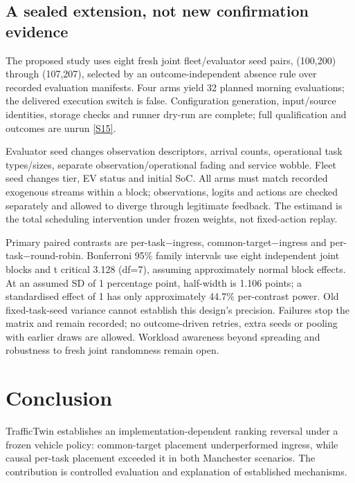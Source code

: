 \documentclass[11pt,a4paper]{article}
\begin{document}
\subsection{A sealed extension, not new confirmation evidence}\label{sec:3.7}

The proposed study uses eight fresh joint fleet/evaluator seed pairs, (100,200) through (107,207), selected by an outcome-independent absence rule over recorded evaluation manifests. Four arms yield 32 planned morning evaluations; the delivered execution switch is false. Configuration generation, input/source identities, storage checks and runner dry-run are complete; full qualification and outcomes are unrun \hyperref[source-s15]{[S15]}.

Evaluator seed changes observation descriptors, arrival counts, operational task types/sizes, separate observation/operational fading and service wobble. Fleet seed changes tier, EV status and initial SoC. All arms must match recorded exogenous streams within a block; observations, logits and actions are checked separately and allowed to diverge through legitimate feedback. The estimand is the total scheduling intervention under frozen weights, not fixed-action replay.

Primary paired contrasts are per-task\ensuremath{-}ingress, common-target\ensuremath{-}ingress and per-task\ensuremath{-}round-robin. Bonferroni 95\% family intervals use eight independent joint blocks and t critical 3.128 (df=7), assuming approximately normal block effects. At an assumed SD of 1 percentage point, half-width is 1.106 points; a standardised effect of 1 has only approximately 44.7\% per-contrast power. Old fixed-task-seed variance cannot establish this design's precision. Failures stop the matrix and remain recorded; no outcome-driven retries, extra seeds or pooling with earlier draws are allowed. Workload awareness beyond spreading and robustness to fresh joint randomness remain open.

\section{Conclusion}\label{sec:4}

TrafficTwin establishes an implementation-dependent ranking reversal under a frozen vehicle policy: common-target placement underperformed ingress, while causal per-task placement exceeded it in both Manchester scenarios. The contribution is controlled evaluation and explanation of established mechanisms.
\end{document}
